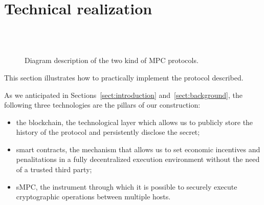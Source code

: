 \section{Technical realization}\label{sect:realization}

\begin{figure}[t]
	\centering
	 \\[20pt]
	 \\[20pt]
	\caption{Diagram description of the two kind of \shortname MPC protocols.}%
	\label{fig:mpc}%
\end{figure}

This section illustrates how to practically implement the protocol described. 

As we anticipated in Sections~\ref{sect:introduction} and~\ref{sect:background}, the following three technologies are the pillars of our construction:
\begin{itemize}
	\item the blockchain, the technological layer which allows us to publicly store the history of the protocol and persistently disclose the secret;
	\item smart contracts, the mechanism that allows us to set economic incentives and penalitations in a fully decentralized execution environment without the need of a trusted third party;
	\item sMPC, the instrument through which it is possible to securely execute cryptographic operations between multiple hosts.   
\end{itemize}

